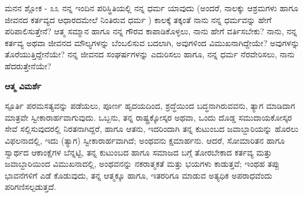\begin{mananam}{\mananamfont \large ಮನನ ಶ್ಲೋಕ - ೩೩}
\footnotesize \mananamtext ನನ್ನ ಇಂದಿನ ಪರಿಸ್ಥಿತಿಯಲ್ಲಿ ನನ್ನ ಧರ್ಮ ಯಾವುದು (ಅಂದರೆ, ನಾಲಕ್ಕು ಆಶ್ರಮಗಳು ಹಾಗೂ ಜೀವನದ ಕರ್ತವ್ಯದ ಆಧಾರದಮೇಲೆ ನಿಂತಿರುವ ಧರ್ಮ ) ಕಾಲಕ್ಕೆ ತಕ್ಕಂತೆ ನಾನು ನನ್ನ ಧರ್ಮವನ್ನು ಹೇಗೆ ಪರಿಪಾಲಿಸುತ್ತೇನೆ? ಆತ್ಮ ಸಮ್ಮಾನ ಹಾಗೂ ನನ್ನ ಗೌರವ ಕಾಪಾಡಿಕೊಳ್ಳಲು, ನಾನು ಹೇಗೆ ವರ್ತಿಸಬೇಕು? ನಾನು, ನನ್ನ ಕರ್ತವ್ಯ ಅಥವಾ ಜೀವನದ ಮೌಲ್ಯಗಳನ್ನು ಬೆಂಬಲಿಸುವ ಬದಲಾಗಿ, ಅವುಗಳಿಂದ ವಿಮುಖನಾಗಿದ್ದೇಯೇ? ಅವುಗಳನ್ನು ತೊರೆಯುತ್ತಿದ್ದೇನೆಯೇ? ನನ್ನ ಜೀವನದ ಸಂಘರ್ಷಗಳನ್ನು ಎದುರಿಸಲು ಹಾಗೂ, ನನ್ನ ಧರ್ಮ ನೆರವೇರಿಸಲು, ನಾನು ಹೆದರುತ್ತೇನೆಯೇ?
\end{mananam}
\WritingHand\enspace\textbf{ಆತ್ಮ ವಿಮರ್ಶೆ}
\begin{inspiration}{\mananamfont \large ಸ್ಪೂರ್ತಿ}
\ssmall \mananamtext ಪರಮಸತ್ಯವನ್ನು ಪಡೆಯಲು, ಪೂರ್ಣ ಹೃದಯದಿಂದ, ಶ್ರದ್ಧೆಯಿಂದ ಬದ್ಧನಾಗಿರುವವನು, ತ್ಯಾಗ ಮಾಡಿದಾಗ ಮಾತ್ರವೇ ಸ್ವೀಕಾರಾರ್ಹವಾಗುವುದು. ಒಬ್ಬನು, ತನ್ನ ರಾಷ್ಟ್ರಕ್ಕೋಸ್ಕರ ಅಥವಾ, ಒಂದು ದೊಡ್ಡ ಸಮುದಾಯಕೋಸ್ಕರ ಸೇವೆ ಸಲ್ಲಿಸುವುದರಲ್ಲಿ ನಿರತನಾಗಿದ್ದರೆ, ಹಾಗೂ ಆತನು, ಇದರಿಂದಾಗಿ ತನ್ನ ಕುಟುಂಬದ ಜವಾಬ್ದಾರಿಯನ್ನು ಹೊರಲು ವಿಫಲನಾದಲ್ಲಿ, ಇದು (ತ್ಯಾಗ) ಸ್ವೀಕಾರಾರ್ಹವಾಗಿದೆ; ಅಂಥವನು ಕ್ಷಮಾರ್ಹನು. ಆದರೆ, ಸೋಮಾರಿತನ ಹಾಗೂ ಸ್ವಾರ್ಥದ ಆಕಾಂಕ್ಷೆಗಳ ಬೆನ್ನಟ್ಟಿ, ತನ್ನ ಕುಟುಂಬದ ಹಾಗೂ ಸಮಾಜದ ಬಗ್ಗೆ ತೋರಬೇಕಾದ ಕರ್ತವ್ಯ  ಮತ್ತು ಜವಾಬ್ದಾರಿಯಿಂದ ವಿಮುಖನಾದಲ್ಲಿ, ಅಂಥವನನ್ನು ನಕರಾತ್ಮಕತೆ ಮತ್ತು ಭಯಗಳು ಕಾಡುತ್ತವೆ; ಇಂಥಹ ತಪ್ಪು ಭಾವನೆಗಳಿಗೆ ಎಡೆ ಕೊಡುವುದು, ತನ್ನ ಆತ್ಮಕ್ಕೂ ಹಾಗೂ, ಇತರರಿಗೂ ಮಾಡುವ ಅತ್ಯಧಿಕ ಅಪರಾಧವೆಂದು ಪರಿಗಣಿಸಲ್ಪಡುತ್ತದೆ. 
\end{inspiration}
\newpage


